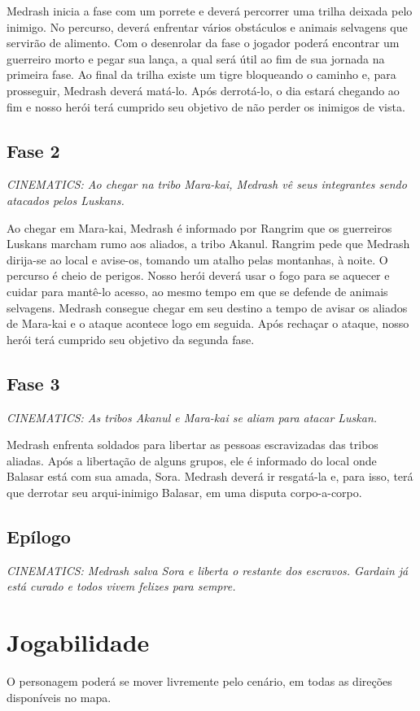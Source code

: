 \documentclass[letterpaper,11pt]{article}
\begin{document}
Medrash inicia a fase com um porrete e deverá percorrer uma trilha deixada pelo inimigo. No percurso, deverá enfrentar vários obstáculos e animais selvagens que servirão de alimento. Com o desenrolar da fase o jogador poderá encontrar um guerreiro morto e pegar sua lança, a qual será útil ao fim de sua jornada na primeira fase. Ao final da trilha existe um tigre bloqueando o caminho e, para prosseguir, Medrash deverá matá-lo. Após derrotá-lo, o dia estará chegando ao fim e nosso herói terá cumprido seu objetivo de não perder os inimigos de vista.

  \subsection{Fase 2}
{\it CINEMATICS: Ao chegar na tribo Mara-kai, Medrash vê seus integrantes sendo atacados pelos Luskans.}

Ao chegar em Mara-kai, Medrash é informado por Rangrim que os guerreiros Luskans marcham rumo aos aliados, a tribo Akanul. Rangrim pede que Medrash dirija-se ao local e avise-os, tomando um atalho pelas montanhas, à noite. O percurso é cheio de perigos. Nosso herói deverá usar o fogo para se aquecer e cuidar para mantê-lo acesso, ao mesmo tempo em que se defende de animais selvagens.
Medrash consegue chegar em seu destino a tempo de avisar os aliados de Mara-kai e o ataque acontece logo em seguida. Após rechaçar o ataque, nosso herói terá cumprido seu objetivo da segunda fase.

  \subsection{Fase 3} 
{\it CINEMATICS: As tribos Akanul e Mara-kai se aliam para atacar Luskan.}

Medrash enfrenta soldados para libertar as pessoas escravizadas das tribos aliadas. Após a libertação de alguns grupos, ele é informado do local onde Balasar está com sua amada, Sora. Medrash deverá ir resgatá-la e, para isso, terá que derrotar seu arqui-inimigo Balasar, em uma disputa corpo-a-corpo.

 \subsection{Epílogo}
 {\it CINEMATICS: Medrash salva Sora e liberta o restante dos escravos. Gardain já está curado e todos vivem felizes para sempre.}

\section{Jogabilidade}
O personagem poderá se mover livremente pelo cenário, em todas as direções disponíveis no mapa.
\end{document}
